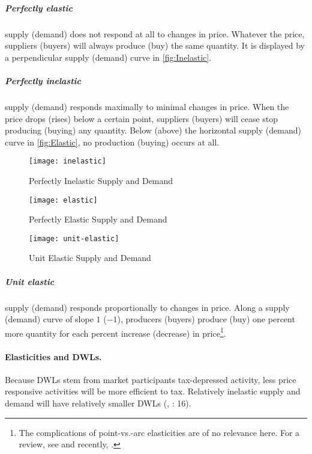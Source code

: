 
\subparagraph{Perfectly elastic} supply (demand) does not respond at all to changes in price. Whatever the price, suppliers (buyers) will always produce (buy) the same quantity. It is displayed by a perpendicular supply (demand) curve in \autoref{fig:Inelastic}.

\subparagraph{Perfectly inelastic} supply (demand) responds maximally to minimal changes in price. When the price drops (rises) below a certain point, suppliers (buyers) will cease stop producing (buying) any quantity. Below (above) the horizontal supply (demand) curve in \autoref{fig:Elastic}, no production (buying) occurs at all.
 
 \begin{figure}[htbp]
	\centering
	\texttt{[image: inelastic]}  
	\caption{Perfectly Inelastic Supply and Demand}
	\label{fig:Inelastic}
\end{figure}
 
 \begin{figure}[htbp]
	\centering
	\texttt{[image: elastic]}  
	\caption{Perfectly Elastic Supply and Demand}
	\label{fig:Elastic}
\end{figure}

 \begin{figure}[htbp]
	\centering
	\texttt{[image: unit-elastic]}  
	\caption{Unit Elastic Supply and Demand}
	\label{fig:UnitElastic}
\end{figure}

\subparagraph{Unit elastic} supply (demand) responds proportionally to changes in price. Along a supply (demand) curve of slope $1$ ($-1$), producers (buyers) produce (buy) one percent more quantity for each percent increase (decrease) in price\footnote{The complications of point-vs.-arc elasticities are of no relevance here. For a review, see \cite{Allen1933} and recently, \cite{Vaughan1988}.}.

\paragraph{Elasticities and DWLs.} Because DWLs stem from market participants tax-depressed activity, less price responsive activities will be more efficient to tax. Relatively inelastic supply and demand will have relatively smaller DWLs (\citealt{Ramsey}, \citealt{Piatkowski2008}: 16). 

